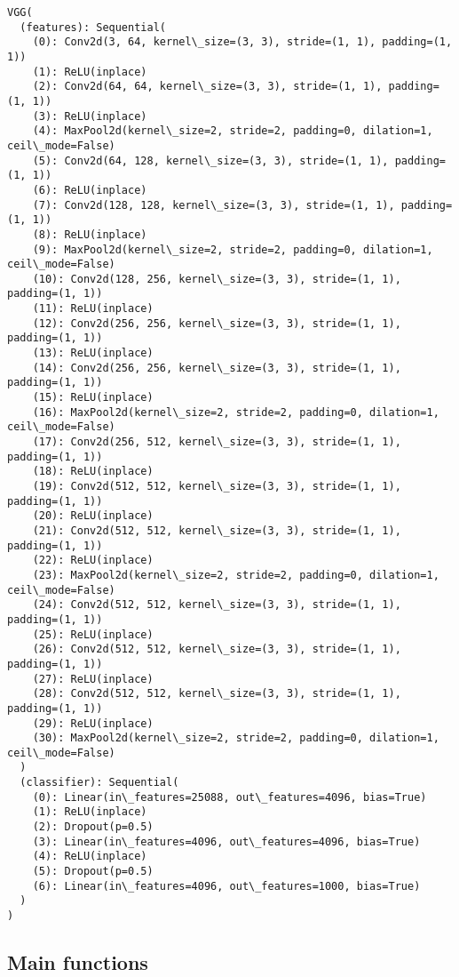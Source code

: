 \documentclass[11pt]{article}
\begin{document}
    \begin{Verbatim}[commandchars=\\\{\}]
VGG(
  (features): Sequential(
    (0): Conv2d(3, 64, kernel\_size=(3, 3), stride=(1, 1), padding=(1, 1))
    (1): ReLU(inplace)
    (2): Conv2d(64, 64, kernel\_size=(3, 3), stride=(1, 1), padding=(1, 1))
    (3): ReLU(inplace)
    (4): MaxPool2d(kernel\_size=2, stride=2, padding=0, dilation=1, ceil\_mode=False)
    (5): Conv2d(64, 128, kernel\_size=(3, 3), stride=(1, 1), padding=(1, 1))
    (6): ReLU(inplace)
    (7): Conv2d(128, 128, kernel\_size=(3, 3), stride=(1, 1), padding=(1, 1))
    (8): ReLU(inplace)
    (9): MaxPool2d(kernel\_size=2, stride=2, padding=0, dilation=1, ceil\_mode=False)
    (10): Conv2d(128, 256, kernel\_size=(3, 3), stride=(1, 1), padding=(1, 1))
    (11): ReLU(inplace)
    (12): Conv2d(256, 256, kernel\_size=(3, 3), stride=(1, 1), padding=(1, 1))
    (13): ReLU(inplace)
    (14): Conv2d(256, 256, kernel\_size=(3, 3), stride=(1, 1), padding=(1, 1))
    (15): ReLU(inplace)
    (16): MaxPool2d(kernel\_size=2, stride=2, padding=0, dilation=1, ceil\_mode=False)
    (17): Conv2d(256, 512, kernel\_size=(3, 3), stride=(1, 1), padding=(1, 1))
    (18): ReLU(inplace)
    (19): Conv2d(512, 512, kernel\_size=(3, 3), stride=(1, 1), padding=(1, 1))
    (20): ReLU(inplace)
    (21): Conv2d(512, 512, kernel\_size=(3, 3), stride=(1, 1), padding=(1, 1))
    (22): ReLU(inplace)
    (23): MaxPool2d(kernel\_size=2, stride=2, padding=0, dilation=1, ceil\_mode=False)
    (24): Conv2d(512, 512, kernel\_size=(3, 3), stride=(1, 1), padding=(1, 1))
    (25): ReLU(inplace)
    (26): Conv2d(512, 512, kernel\_size=(3, 3), stride=(1, 1), padding=(1, 1))
    (27): ReLU(inplace)
    (28): Conv2d(512, 512, kernel\_size=(3, 3), stride=(1, 1), padding=(1, 1))
    (29): ReLU(inplace)
    (30): MaxPool2d(kernel\_size=2, stride=2, padding=0, dilation=1, ceil\_mode=False)
  )
  (classifier): Sequential(
    (0): Linear(in\_features=25088, out\_features=4096, bias=True)
    (1): ReLU(inplace)
    (2): Dropout(p=0.5)
    (3): Linear(in\_features=4096, out\_features=4096, bias=True)
    (4): ReLU(inplace)
    (5): Dropout(p=0.5)
    (6): Linear(in\_features=4096, out\_features=1000, bias=True)
  )
)

    \end{Verbatim}

    \subsection{Main functions}\label{main-functions}
\end{document}
